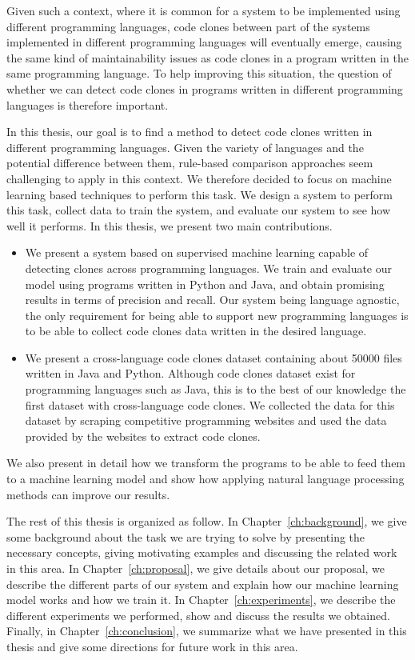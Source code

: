 Given such a context, where it is common for a system to be implemented using
different programming languages, code clones between part of the systems
implemented in different programming languages will eventually emerge, causing
the same kind of maintainability issues as code clones in a program written in
the same programming language. To help improving this situation, the question of
whether we can detect code clones in programs written in different programming
languages is therefore important.

In this thesis, our goal is to find a method to detect code clones written in
different programming languages. Given the variety of languages and the
potential difference between them, rule-based comparison approaches seem
challenging to apply in this context. We therefore decided to focus on machine
learning based techniques to perform this task. We design a system to perform
this task, collect data to train the system, and evaluate our system to see how
well it performs. In this thesis, we present two main contributions.

\begin{itemize}
\item We present a system based on supervised machine learning capable of
  detecting clones across programming languages. We train and evaluate our model
  using programs written in Python and Java, and obtain promising results in
  terms of precision and recall. Our system being language agnostic, the only
  requirement for being able to support new programming languages is to be able
  to collect code clones data written in the desired language.
\item We present a cross-language code clones dataset containing about 50000
  files written in Java and Python. Although code clones dataset exist for
  programming languages such as Java, this is to the best of our knowledge the
  first dataset with cross-language code clones. We collected the data for this
  dataset by scraping competitive programming websites and used the data
  provided by the websites to extract code clones.
\end{itemize}

We also present in detail how we transform the programs to be able to feed them
to a machine learning model and show how applying natural language processing
methods can improve our results.

The rest of this thesis is organized as follow. In
Chapter~\ref{ch:background}, we give some background about the task we are
trying to solve by presenting the necessary concepts, giving motivating examples
and discussing the related work in this area. In Chapter~\ref{ch:proposal}, we
give details about our proposal, we describe the different parts of our system
and explain how our machine learning model works and how we train it. In
Chapter~\ref{ch:experiments}, we describe the different experiments we
performed, show and discuss the results we obtained. Finally, in
Chapter~\ref{ch:conclusion}, we summarize what we have presented in this thesis
and give some directions for future work in this area.
